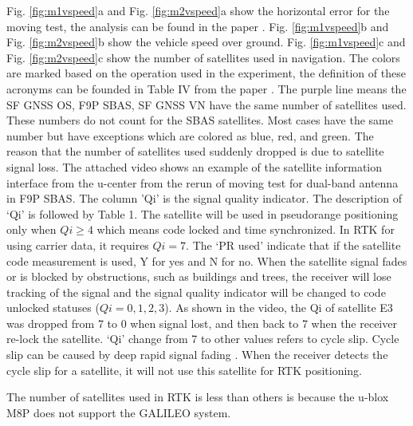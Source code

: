 \documentclass[letterpaper, 10 pt,onecolumn]{article}
\begin{document}
	Fig. \ref{fig:m1vspeed}a and Fig. \ref{fig:m2vspeed}a show the horizontal error for the moving test, the analysis can be found in the paper \cite{hu2021using}. Fig. \ref{fig:m1vspeed}b and Fig. \ref{fig:m2vspeed}b show the vehicle speed over ground. Fig. \ref{fig:m1vspeed}c and Fig. \ref{fig:m2vspeed}c show the number of satellites used in navigation. The colors are marked based on the operation used in the experiment, the definition of these acronyms can be founded in Table IV from the paper \cite{hu2021using}. The purple line means the SF GNSS OS, F9P SBAS, SF GNSS VN have the same number of satellites used. These numbers do not count for the SBAS satellites.
	Most cases have the same number but have exceptions which are colored as blue, red, and green. The reason that the number of satellites used suddenly dropped is due to satellite signal loss. The attached video shows an example of the satellite information interface from the u-center from the rerun of moving test for dual-band antenna in F9P SBAS. The column 'Qi' is the signal quality indicator. The description of `Qi' is followed by Table 1. The satellite will be used in pseudorange positioning only when $Qi \geq 4$ which means code locked and time synchronized. In RTK for using carrier data, it requires $Qi = 7$. The `PR used' indicate that if the satellite code measurement is used, Y for yes and N for no. When the satellite signal fades or is blocked by obstructions, such as buildings and trees, the receiver will lose tracking of the signal and the signal quality indicator will be changed to code unlocked statuses ($Qi = 0,1,2,3$). As shown in the video, the Qi of satellite E3 was dropped from 7 to 0 when signal lost, and then back to 7 when the receiver re-lock the satellite. `Qi' change from 7 to other values refers to cycle slip. Cycle slip can be caused by deep rapid signal fading \cite{sennott1992use}. When the receiver detects the cycle slip for a satellite, it will not use this satellite for RTK positioning.
	
	The number of satellites used in RTK is less than others is because the u-blox M8P does not support the GALILEO system.
	
\end{document}
